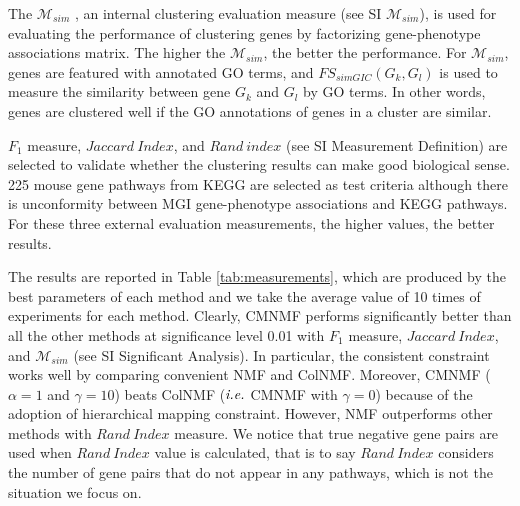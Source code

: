 \documentclass{bmcart}
\begin{document}
The $\mathcal{M}_{sim}$ \cite{Bordino2010}, an internal clustering evaluation measure ({\color{red}see SI $\mathcal{M}_{sim}$}), is used for evaluating the performance of clustering genes by factorizing gene-phenotype associations matrix. The higher the $\mathcal{M}_{sim}$, the better the performance. For $\mathcal{M}_{sim}$, genes are featured with annotated GO terms, and $FS_{simGIC}(G_k,G_l)$ \cite{Teng2013} is used to measure the similarity between gene $G_k$ and $G_l$ by GO terms. In other words, genes are clustered well if the GO annotations of genes in a cluster are similar.

$F_1$ measure, $Jaccard\ Index$, and $Rand\ index$ ({\color{red}see SI Measurement Definition}) are selected to validate whether the clustering results can make good biological sense. 225 mouse gene pathways from KEGG are selected as test criteria although there is unconformity between MGI gene-phenotype associations and KEGG pathways. For these three external evaluation measurements, the higher values, the better results.

The results are reported in Table \ref{tab:measurements}, which are produced by the best parameters of each method and we take the average value of 10 times of experiments for each method. Clearly, CMNMF performs significantly better than all the other methods at significance level 0.01 with $F_1$ measure, $Jaccard\ Index$, and $\mathcal{M}_{sim}$ (see {\color{red} SI Significant Analysis}). In particular, the consistent constraint works well by comparing convenient NMF and ColNMF. Moreover, CMNMF ($\alpha=1$ and $\gamma=10$) beats ColNMF ($\emph{i.e.}$ CMNMF with $\gamma=0$) because of the adoption of hierarchical mapping constraint. However, NMF outperforms other methods with $Rand\ Index$ measure. We notice that true negative gene pairs are used when $Rand\ Index$ value is calculated, that is to say $Rand\ Index$ considers the number of gene pairs that do not appear in any pathways, which is not the situation we focus on.

\end{document}

